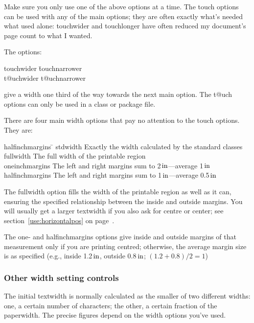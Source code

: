 \documentclass[11pt,loose,twoside,touchwider,longish,
                      noheaders,a4paper,notstdmargins]{report}
\makeatletter
\newcommand*{\unit}[1]{\ifmmode\@unit{\hbox{#1}}\else$\@unit{\hbox{#1}}$\fi}%
\let\units=\unit
\def\@unit#1{{\setbox0=\hbox{#1}\ifdim\wd0<1.125em\,\else\>\fi\box0}}
\DeclareRobustCommand*{\comname}[1]{{\ttfamily\makeatletter\bs #1\makeatother}}
\newcommand*{\optname}[1]{{\ttfamily #1}}
\makeatother
\begin{document}
Make sure you only use one of the above options at a time.  The
\optname{touch} options can be used with any of the main options; they
are often exactly what's needed what used alone: \optname{touchwider}
and \optname{touchlonger} have often reduced my document's
page count to what I wanted.

The options:
\begin{tabbing}
\optname{touchwider} \= \optname{touchnarrower} \\
\optname{t@uchwider} \> \optname{t@uchnarrower}
\end{tabbing}
give a width one third of the way towards the next main option.  The
\optname{t@uch} options can only be used in a class or package file.

There are four main width options that pay no attention to the
\optname{touch} options.  They are:
\begin{tabbing}
\optname{halfinchmargins} \= \kill
\optname{stdwidth} \> Exactly the width calculated by the standard classes\\
\optname{fullwidth} \> The full width of the printable region\\
\optname{oneinchmargins} \>
The left and right margins sum to 2\units{in}---average 1\units{in}\\
\optname{halfinchmargins} \>
The left and right margins sum to 1\units{in}---average 0.5\units{in}
\end{tabbing}
The \optname{fullwidth} option fills the width of the printable region
as well as it can, ensuring the specified relationship between the
inside and outside margins.  You will usually get a larger
\optname{textwidth} if you also ask for \optname{centre} or
\optname{center}; see section~\ref{use:horizontalpos} on
page~\pageref{use:horizontalpos}.

The \optname{one-} and \optname{halfinchmargins} options give inside
and outside margins of that measurement only if you are printing
centred; otherwise, the average margin size is as specified (e.g.,
inside 1.2\units{in}, outside 0.8\units{in}; $(1.2 + 0.8) / 2 = 1$)

\subsubsection{Other width setting controls}

The initial \comname{textwidth} is normally calculated as the smaller
of two different widths: one, a certain number of characters; the
other, a certain fraction of the \comname{paperwidth}.  The precise
figures depend on the width options you've used.
\end{document}
